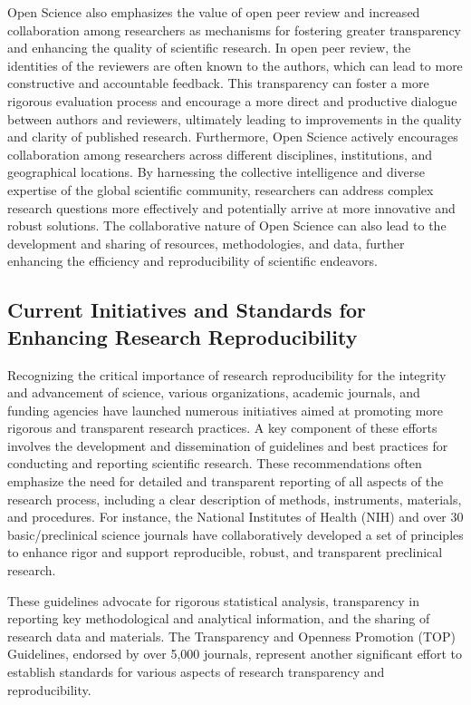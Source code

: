 \documentclass{article}
\begin{document}
Open Science also emphasizes the value of open peer review and increased collaboration among researchers as mechanisms for fostering greater transparency and enhancing the quality of scientific research. In open peer review, the identities of the reviewers are often known to the authors, which can lead to more constructive and accountable feedback. This transparency can foster a more rigorous evaluation process and encourage a more direct and productive dialogue between authors and reviewers, ultimately leading to improvements in the quality and clarity of published research. Furthermore, Open Science actively encourages collaboration among researchers across different disciplines, institutions, and geographical locations. By harnessing the collective intelligence and diverse expertise of the global scientific community, researchers can address complex research questions more effectively and potentially arrive at more innovative and robust solutions. The collaborative nature of Open Science can also lead to the development and sharing of resources, methodologies, and data, further enhancing the efficiency and reproducibility of scientific endeavors.

\subsection{Current Initiatives and Standards for Enhancing Research Reproducibility}

Recognizing the critical importance of research reproducibility for the integrity and advancement of science, various organizations, academic journals, and funding agencies have launched numerous initiatives aimed at promoting more rigorous and transparent research practices. A key component of these efforts involves the development and dissemination of guidelines and best practices for conducting and reporting scientific research. These recommendations often emphasize the need for detailed and transparent reporting of all aspects of the research process, including a clear description of methods, instruments, materials, and procedures. For instance, the National Institutes of Health (NIH) and over 30 basic/preclinical science journals have collaboratively developed a set of principles to enhance rigor and support reproducible, robust, and transparent preclinical research.

These guidelines advocate for rigorous statistical analysis, transparency in reporting key methodological and analytical information, and the sharing of research data and materials. The Transparency and Openness Promotion (TOP) Guidelines, endorsed by over 5,000 journals, represent another significant effort to establish standards for various aspects of research transparency and reproducibility.
\end{document}
